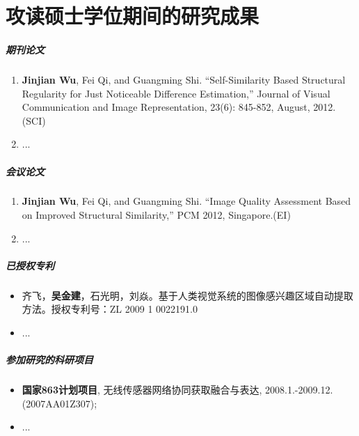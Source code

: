 
\chapter*{攻读硕士学位期间的研究成果}
\label{char:achi}

\paragraph{期刊论文}

\begin{enumerate}
\item \textbf{Jinjian Wu}, Fei Qi, and Guangming Shi. “Self-Similarity Based Structural Regularity for Just Noticeable Difference Estimation,” Journal of Visual Communication and Image Representation, 23(6): 845-852, August, 2012.(SCI)

\item ...
\end{enumerate}

\paragraph{会议论文}
\begin{enumerate}
\item \textbf{Jinjian Wu}, Fei Qi, and Guangming Shi. “Image Quality Assessment Based on Improved Structural Similarity,” PCM 2012, Singapore.(EI)

\item ...
\end{enumerate}


\paragraph{已授权专利}

\begin{itemize}
\item
齐飞，\textbf{吴金建}，石光明，刘焱。基于人类视觉系统的图像感兴趣区域自动提取方法。授权专利号：ZL 2009 1 0022191.0

\item...
\end{itemize}

\paragraph{参加研究的科研项目}

\begin{itemize}
\item 
\textbf{国家863计划项目}, 无线传感器网络协同获取融合与表达, 2008.1.-2009.12. (2007AA01Z307);
\item ...
\end{itemize}

